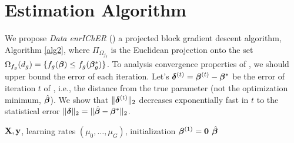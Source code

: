 \section{Estimation Algorithm}
\label{sec:opt}
We propose \emph{Data enrIChER} (\dc) a projected block gradient descent algorithm, Algorithm \cref{alg2}, where $\Pi_{\Omega_{f_g}}$ is the Euclidean projection onto the set $\Omega_{f_g}(d_g) = \{f_g(\boldsymbol{\beta}) \leq f_g(\boldsymbol{\beta}_g^*)\}$.%
To analysis convergence properties of \dc, we should upper bound the error of each iteration.%
Let's $\boldsymbol{\delta}^{(t)} = \boldsymbol{\beta}^{(t)} - \boldsymbol{\beta}^*$ be the error of  iteration $t$ of \dc, i.e., the distance from the true parameter (not the optimization minimum, $\hat{\boldsymbol{\beta}}$).
We show that $\|\boldsymbol{\delta}^{(t)}\|_{2}$ decreases exponentially fast in $t$ to the statistical error $\|\boldsymbol{\delta}\|_{2} = \|\hat{\boldsymbol{\beta}} - \boldsymbol{\beta}^*\|_{2}$.
\begin{algorithm}[t]
	\caption{  \dc }
	\label{alg2}
	\begin{algorithmic}[1]
		 $\mathbf{X}, \mathbf{y}$, learning rates $(\mu_0, \dots, \mu_G)$, initialization $\boldsymbol{\beta} ^{(1)} = \mathbf{0}$
		 $\hat{\boldsymbol{\beta}}$
		\ENDFOR
		\ENDFOR
	\end{algorithmic}
\end{algorithm}
